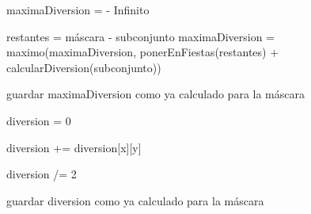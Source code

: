 \begin{algorithmic}



    	\State {}
  	\EndIf		

    	\State {}
  	\EndIf	

  \State maximaDiversion = - Infinito

  	\State restantes = máscara - subconjunto  
  	\State maximaDiversion = maximo(maximaDiversion, ponerEnFiestas(restantes) + calcularDiversion(subconjunto))
  \EndFor

  \State guardar maximaDiversion como ya calculado para la máscara

 \State {}

\EndFunction

\end{algorithmic}

\vspace{5mm}


\begin{algorithmic}



    	\State {}
  	\EndIf		

  	\State diversion = 0

  			\State diversion += diversion[x][y]
  		\EndFor
  	\EndFor

  	\State diversion /= 2 

  	\State guardar diversion como ya calculado para la máscara

 	\State {}

\EndFunction

\end{algorithmic}